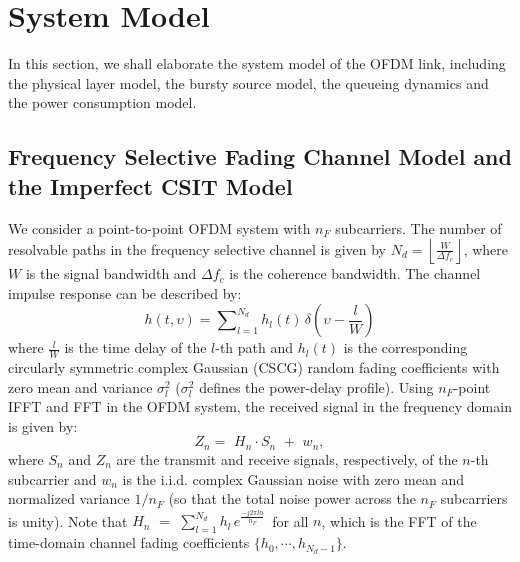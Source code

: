 \documentclass[11pt,journal, onecolumn]{./IEEEtran}
\newcommand{\red}{\color{black}}
\begin{document}
\section{System Model}

In this section, we shall elaborate the system model of the OFDM link, including the physical layer model, the bursty source model, the queueing dynamics and the power consumption model.


\subsection{Frequency Selective Fading Channel Model and the Imperfect CSIT Model}

We consider a point-to-point OFDM system with $n_F$ subcarriers. The number of resolvable paths in the frequency selective channel is given by $N_d = \left\lfloor {\frac{W}{{\Delta {f_c}}}} \right\rfloor$, where $W$ is the signal bandwidth and $\Delta {f_c}$ is the coherence bandwidth. The channel impulse response can be described by:
\[h(t,\upsilon ) = \sum\nolimits_{l = 1}^{{N_d}} {{h_l}(t)\,} \delta \left( {\upsilon  - \frac{l}{W}} \right)\]
where $\frac{l}{W}$ is the time delay of the $l$-th path and $h_l(t)$ is the corresponding circularly symmetric complex Gaussian (CSCG) random fading coefficients with zero mean and {\red variance $\sigma_l^2$ ($\sigma_l^2$ defines the power-delay profile).} Using $n_F$-point IFFT and FFT in the OFDM system, the received signal in the frequency domain is given by:
\[{Z_n} = \,\,{H_n} \cdot {S_n}\,\, + \,\,{w_n}, \]
where $S_n$ and $Z_n$ are the transmit and receive signals, respectively, of the $n$-th subcarrier and $w_n$ is the i.i.d. complex Gaussian noise with zero mean and normalized variance $1/n_F$ (so that the total noise power across the $n_F$ subcarriers is unity).
Note that $H_n\,\, = \,\,\sum\nolimits_{l = 1}^{N_d} {{h_l}\,{e^{\frac{{ - j2\pi ln}}{{{n_F}}}}}\,}$ for all $n$, which is the FFT of the time-domain channel fading coefficients $\{h_0, \cdots, h_{N_d-1}\}$.
\end{document}
